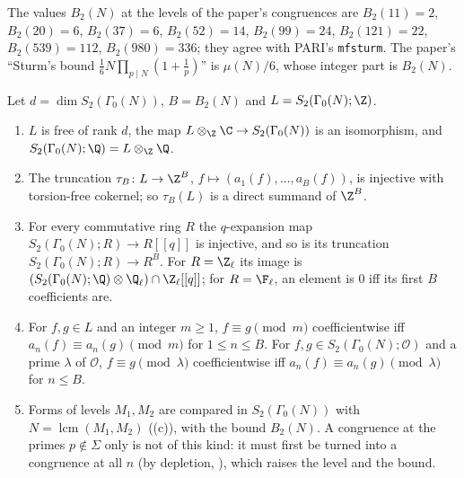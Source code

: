 The values $B_2(N)$ at the levels of the paper's congruences are $B_2(11)=2$, $B_2(20)=6$, $B_2(37)=6$, $B_2(52)=14$, $B_2(99)=24$, $B_2(121)=22$, $B_2(539)=112$,
$B_2(980)=336$; they agree with PARI's \texttt{mfsturm}. The paper's ``Sturm's bound $\frac16N\prod_{p\mid N}(1+\frac1p)$'' is $\mu(N)/6$, whose integer part is $B_2(N)$.

\begin{corollary}\label{cor:modforms:integral-lattice}
Let $d=\dim S_2(\Gamma_0(N))$, $B=B_2(N)$ and $L=S_2(\Gamma_0(N);\Z)$.
\begin{enumerate}[label=(\roman*)]
\item $L$ is free of rank $d$, the map $L\otimes_\Z\C\to S_2(\Gamma_0(N))$ is an isomorphism, and $S_2(\Gamma_0(N);\Q)=L\otimes_\Z\Q$.
\item The truncation $\tau_B\colon L\to\Z^B$, $f\mapsto(a_1(f),\dots,a_B(f))$, is injective with torsion-free cokernel; so $\tau_B(L)$ is a direct summand of $\Z^B$.
\item For every commutative ring $R$ the $q$-expansion map $S_2(\Gamma_0(N);R)\to R[[q]]$ is injective, and so is its truncation $S_2(\Gamma_0(N);R)\to R^B$. For $R=\Z_\ell$ its image is
$(S_2(\Gamma_0(N);\Q)\otimes\Q_\ell)\cap\Z_\ell[[q]]$; for $R=\F_\ell$, an element is $0$ iff its first $B$ coefficients are.
\item For $f,g\in L$ and an integer $m\ge1$, $f\equiv g\pmod m$ coefficientwise iff $a_n(f)\equiv a_n(g)\pmod m$ for $1\le n\le B$. For $f,g\in S_2(\Gamma_0(N);\mathcal O)$ and a prime $\lambda$
of $\mathcal O$, $f\equiv g\pmod\lambda$ coefficientwise iff $a_n(f)\equiv a_n(g)\pmod\lambda$ for $n\le B$.
\item Forms of levels $M_1,M_2$ are compared in $S_2(\Gamma_0(N))$ with $N=\operatorname{lcm}(M_1,M_2)$ ((c)), with the bound $B_2(N)$. A congruence at the primes
$p\notin\Sigma$ only is not of this kind: it must first be turned into a congruence at all $n$ (by depletion, ), which raises the level and the bound.
\end{enumerate}
\end{corollary}


